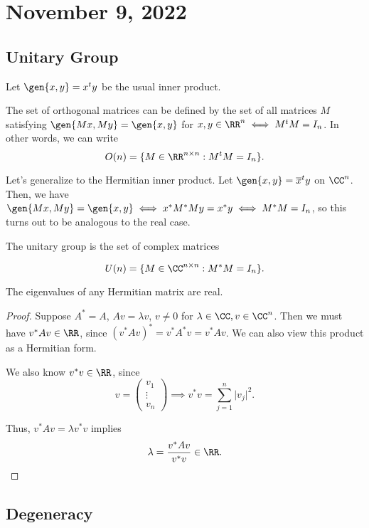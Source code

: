 \section{November 9, 2022}

\subsection{Unitary Group}

Let $\gen{x,y} = x^ty$ be the usual inner product. 

The set of orthogonal matrices can be defined by the set of all matrices $M$ satisfying $\gen{Mx, My} = \gen{x,y}$ for $x, y\in \RR^n \iff M^tM = I_n$. In other words, we can write 
\[O(n) = \{M\in \RR^{n\times n} : M^tM = I_n\}.\]

Let's generalize to the Hermitian inner product. Let $\gen{x,y} = \overline{x}^ty$ on $\CC^n$. Then, we have $\gen{Mx,My} = \gen{x,y}\iff x^* M^* My = x^*y\iff M^*M = I_n$, so this turns out to be analogous to the real case. 

\begin{definition}

The \ac{unitary group} is the set of complex matrices 

\[U(n) = \{M\in \CC^{n\times n} : M^*M = I_n\}.\]
\end{definition}

\begin{theorem}
\proplabel 

The eigenvalues of any Hermitian matrix are real. 
\end{theorem}

\begin{proof}
Suppose $A^* = A$, $Av = \lambda v$, $v\neq 0$ for $\lambda\in \CC, v\in \CC^n$. Then we must have $v^*Av\in \RR$, since $(v^*Av)^* = v^*A^*v = v^*Av$. We can also view this product as a Hermitian form. 

We also know $v^*v\in \RR$, since 
\[v = \begin{pmatrix}v_1 \\ \vdots \\ v_n\end{pmatrix} \implies v^*v = \sum_{j=1}^n \vert v_j\vert ^2.\]

Thus, $v^*Av = \lambda v^*v$ implies 
\[\lambda = \frac{v^*Av}{v^*v}\in \RR. \]
\end{proof}

\subsection{Degeneracy}

